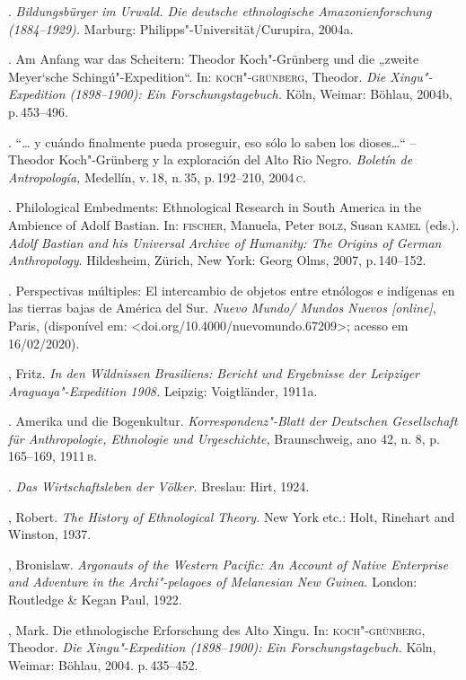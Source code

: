 \begin{bibliohedra}
 \titidem. \textit{Bildungsbürger im Urwald. Die deutsche
 ethnologische Amazonienforschung (1884--1929).} Marburg:
 Philipps"-Universität/Curupira, 2004a.

 \titidem. Am Anfang war das Scheitern: Theodor Koch"-Grünberg
 und die „zweite Meyer`sche Schingú"-Expedition``. In: \textsc{koch"-grünberg},
 Theodor. \textit{Die Xingu"-Expedition (1898--1900): Ein
 Forschungstagebuch.} Köln, Weimar: Böhlau, 2004b, p.\,453--496.

 \titidem. ``\ldots{} y cuándo finalmente pueda proseguir, eso
 sólo lo saben los dioses\ldots{}`` -- Theodor Koch"-Grünberg y la
 exploración del Alto Rio Negro. \textit{Boletín de Antropología,}
 Medellín, v.\,18, n.\,35, p.\,192--210, 2004\,\textsc{c}.

 \titidem. Philological Embedments: Ethnological Research in
 South America in the Ambience of Adolf Bastian. In: \textsc{fischer}, Manuela,
 Peter \textsc{bolz}, Susan \textsc{kamel} (eds.). \textit{Adolf Bastian and his Universal
 Archive of Humanity: The Origins of German Anthropology}. Hildesheim,
 Zürich, New York: Georg Olms, 2007, p.\,140--152.

 \titidem. Perspectivas múltiples: El intercambio de objetos
 entre etnólogos e indígenas en las tierras bajas de América del Sur.
 \textit{Nuevo Mundo/ Mundos Nuevos {[}online{]}}, Paris, (disponível
 em: \textless{}doi.org/10.4000/nuevomundo.67209\textgreater{}; acesso em
 16/02/2020).

 , Fritz. \textit{In den Wildnissen Brasiliens: Bericht und
 Ergebnisse der Leipziger Araguaya"-Expedition 1908.} Leipzig:
 Voigtländer, 1911a.

 \titidem. Amerika und die Bogenkultur.
 \textit{Korrespondenz"-Blatt der Deutschen Gesellschaft für
 Anthropologie, Ethnologie und Urgeschichte,} Braunschweig, ano 42, n.
 8, p.\,165--169, 1911\,\textsc{b}.

 \titidem. \textit{Das Wirtschaftsleben der Völker.} Breslau:
 Hirt, 1924.

 , Robert. \textit{The History of Ethnological Theory.} New York
 etc.: Holt, Rinehart and Winston, 1937.

 , Bronislaw. \textit{Argonauts of the Western Pacific: An
 Account of Native Enterprise and Adventure in the Archi"-pelagoes of
 Melanesian New Guinea.} London: Routledge \& Kegan Paul, 1922.

 , Mark. Die ethnologische Erforschung des Alto Xingu. In:
 \textsc{koch"-grünberg}, Theodor. \textit{Die Xingu"-Expedition (1898--1900): Ein
 Forschungstagebuch.} Köln, Weimar: Böhlau, 2004. p.\,435--452.


\end{bibliohedra}

